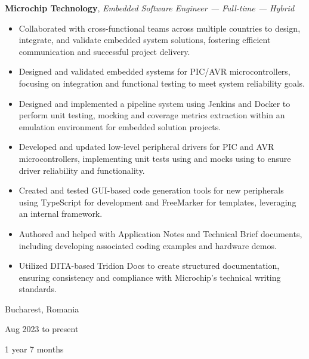 \documentclass[10pt, a4paper]{article}
\newenvironment{highlights}{
    \begin{itemize}[
        topsep=0.1 cm,
        parsep=0.1 cm,
        partopsep=0pt,
        itemsep=0pt,
        leftmargin=0 cm + 10pt
    ]
}{
    \end{itemize}
} %
\newenvironment{twocolentry}[2][]{
    \onecolentry
    \def\secondColumn{#2}
    \setcolumnwidth{\fill, 3.5 cm}
    \begin{paracol}{2}
}{
    \switchcolumn \raggedleft \secondColumn
    \end{paracol}
    \endonecolentry
} %
\let\hrefWithoutArrow\href
\renewcommand{\href}[2]{\hrefWithoutArrow{#1}{\ifthenelse{\equal{#2}{}}{ }{#2 }\raisebox{.15ex}{\footnotesize \faExternalLink*}}}
\begin{document}
        
        \begin{twocolentry}{
            Bucharest, Romania

        Aug 2023 to present

        1 year 7 months
        }
            \textbf{Microchip Technology}, \textit{Embedded Software Engineer — Full-time — Hybrid}
            \begin{highlights}
                \item Collaborated with cross-functional teams across multiple countries to design, integrate, and validate embedded system solutions, fostering efficient communication and successful project delivery.
                \item Designed and validated embedded systems for PIC/AVR microcontrollers, focusing on integration and functional testing to meet system reliability goals.
                \item Designed and implemented a pipeline system using Jenkins and Docker to perform unit testing, mocking and coverage metrics extraction within an emulation environment for embedded solution projects.
                \item Developed and updated low-level peripheral drivers for PIC and AVR microcontrollers, implementing unit tests using \href{https://www.throwtheswitch.org/unity}{Unity} and mocks using \href{https://github.com/ThrowTheSwitch/CMock}{CMock} to ensure driver reliability and functionality.
                \item Created and tested GUI-based code generation tools for new peripherals using TypeScript for development and FreeMarker for templates, leveraging an internal framework.
                \item Authored and helped with Application Notes and Technical Brief documents, including developing associated coding examples and hardware demos.
                \item Utilized DITA-based Tridion Docs to create structured documentation, ensuring consistency and compliance with Microchip’s technical writing standards.
            \end{highlights}
        \end{twocolentry}


        \vspace{0.2 cm}
\end{document}
